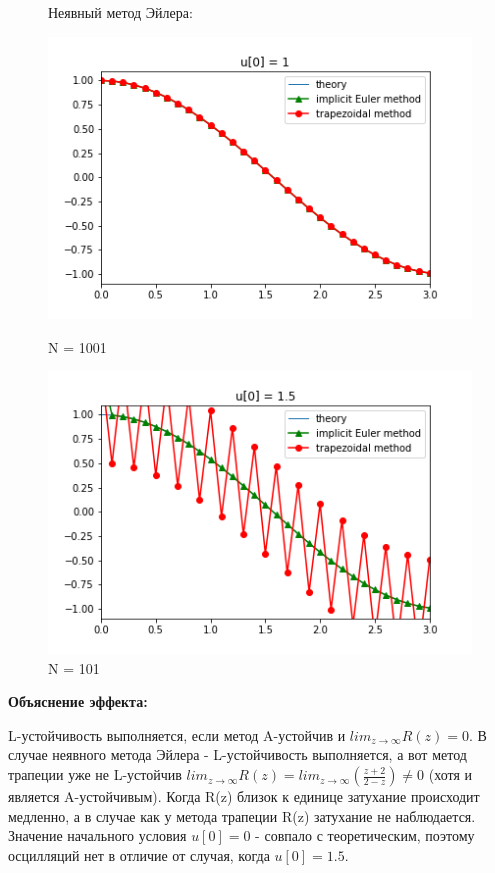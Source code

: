 \documentclass[11pt]{article}
\begin{document}
           
\begin{figure}[h]
    \caption{Неявный метод Эйлера:}
    \begin{center}
    \begin{minipage}[h]{0.45\linewidth}
    \includegraphics[width=1\linewidth]{graph_1.png}
    \caption{N = 1001}
    \label{p2}
    \end{minipage}
    \hfill
    \begin{minipage}[h]{0.45\linewidth}
    \includegraphics[width=1\linewidth]{graph_15.png}
    \caption{N = 101}
    \label{p3}
    \end{minipage}
    \end{center}
    \end{figure}
    
    \textbf{Объяснение эффекта:}

    L-устойчивость выполняется, если метод A-устойчив и
\(lim_{z \rightarrow \infty}R(z) = 0\). В случае неявного метода Эйлера
- L-устойчивость выполняется, а вот метод трапеции уже не L-устойчив \(lim_{z \rightarrow \infty}R(z) = lim_{z \rightarrow \infty}(\frac{z+2}{2-z})\neq 0\)
(хотя и является A-устойчивым). Когда \textbar R(z)\textbar{} близок к
единице затухание происходит медленно, а в случае как у метода трапеции
\textbar R(z) затухание не наблюдается. Значение начального условия \(u[0]=0\) - совпало с
теоретическим, поэтому осцилляций нет в отличие от случая, когда
\(u[0]=1.5\).

    
    
    
\end{document}
